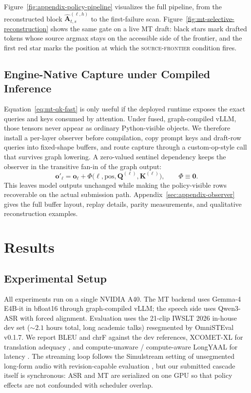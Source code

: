 \documentclass[11pt]{article}
\begin{document}
Figure~\ref{fig:appendix-policy-pipeline} visualizes the full pipeline, from
the reconstructed block $\widehat{\mathbf{A}}^{(\ell,h)}_{t,s}$ to the
first-failure scan. Figure~\ref{fig:mt-selective-reconstruction} shows the
same gate on a live MT draft: black stars mark drafted tokens whose source
argmax stays on the accessible side of the frontier, and the first red star
marks the position at which the \textsc{source-frontier} condition fires.




\subsection{Engine-Native Capture under Compiled Inference}

Equation~\eqref{eq:mt-qk-fast} is only useful if the deployed runtime exposes
the exact queries and keys consumed by attention. Under fused, graph-compiled
vLLM, those tensors never appear as ordinary Python-visible objects. We
therefore install a per-layer observer before compilation, copy prompt keys and
draft-row queries into fixed-shape buffers, and route capture through a
custom-op-style call that survives graph lowering. A zero-valued sentinel
dependency keeps the observer in the transitive fan-in of the graph output:
\begin{equation}
  \mathbf{o}'_\ell =
  \mathbf{o}_\ell +
  \Phi\bigl(\ell,\mathrm{pos},\mathbf{Q}^{(\ell)},\mathbf{K}^{(\ell)}\bigr),
  \qquad \Phi \equiv \mathbf{0}.
  \label{eq:mt-sentinel}
\end{equation}
This leaves model outputs unchanged while making the policy-visible rows
recoverable on the actual submission path. Appendix~\ref{sec:appendix-observer}
gives the full buffer layout, replay details, parity measurements, and
qualitative reconstruction examples.

\section{Results}
\label{sec:results}

\subsection{Experimental Setup}
\label{sec:setup}

All experiments run on a single NVIDIA A40. The MT backend uses Gemma-4 E4B-it
in bfloat16 through graph-compiled vLLM; the speech side uses Qwen3-ASR with
forced alignment. Evaluation uses the 21-clip IWSLT 2026 in-house dev set
($\sim 2.1$ hours total, long academic talks) resegmented by OmniSTEval
v0.1.7. We report BLEU and chrF against the dev references, XCOMET-XL for
translation adequacy \citep{xcometxl23}, and compute-unaware / compute-aware
LongYAAL for latency \citep{longyaal25}. The streaming loop follows the
Simulstream setting of unsegmented long-form audio with revision-capable
evaluation \citep{simulstream25}, but our submitted cascade itself is
synchronous: ASR and MT are serialized on one GPU so that policy effects are
not confounded with scheduler overlap.
\end{document}
